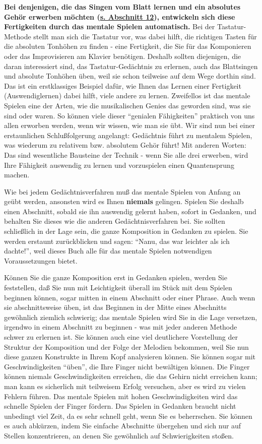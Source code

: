\textbf{Bei denjenigen, die das Singen vom Blatt lernen und ein absolutes Gehör erwerben möchten (\hyperref[c1iii12]{s. Abschnitt 12}), entwickeln sich diese Fertigkeiten durch das mentale Spielen automatisch.}
Bei der Tastatur-Methode stellt man sich die Tastatur vor, was dabei hilft, die richtigen Tasten für die absoluten Tonhöhen zu finden - eine Fertigkeit, die Sie für das Komponieren oder das Improvisieren am Klavier benötigen.
Deshalb sollten diejenigen, die daran interessiert sind, das Tastatur-Gedächtnis zu erlernen, auch das Blattsingen und absolute Tonhöhen üben, weil sie schon teilweise auf dem Wege dorthin sind.
Das ist ein erstklassiges Beispiel dafür, wie Ihnen das Lernen einer Fertigkeit (Auswendiglernen) dabei hilft, viele andere zu lernen.
Zweifellos ist das mentale Spielen eine der Arten, wie die musikalischen Genies das geworden sind, was sie sind oder waren.
So können viele dieser \enquote{genialen Fähigkeiten} praktisch von uns allen erworben werden, wenn wir wissen, wie man sie übt.
Wir sind nun bei einer erstaunlichen Schlußfolgerung angelangt: Gedächtnis führt zu mentalem Spielen, was wiederum zu relativem bzw. absolutem Gehör führt!
Mit anderen Worten: Das sind wesentliche Bausteine der Technik - wenn Sie alle drei erwerben, wird Ihre Fähigkeit auswendig zu lernen und vorzuspielen einen Quantensprung machen.

Wie bei jedem Gedächtnisverfahren muß das mentale Spielen von Anfang an geübt werden, ansonsten wird es Ihnen \textbf{niemals} gelingen.
Spielen Sie deshalb einen Abschnitt, sobald sie ihn auswendig gelernt haben, sofort in Gedanken, und behalten Sie dieses wie die anderen Gedächtnisverfahren bei.
Sie sollten schließlich in der Lage sein, die ganze Komposition in Gedanken zu spielen.
Sie werden erstaunt zurückblicken und sagen: \enquote{Nanu, das war leichter als ich dachte!}, weil dieses Buch alle für das mentale Spielen notwendigen Voraussetzungen bietet.

Können Sie die ganze Komposition erst in Gedanken spielen, werden Sie feststellen, daß Sie nun mit Leichtigkeit überall im Stück mit dem Spielen beginnen können, sogar mitten in einem Abschnitt oder einer Phrase.
Auch wenn sie abschnittsweise üben, ist das Beginnen in der Mitte eines Abschnitts gewöhnlich ziemlich schwierig; das mentale Spielen wird Sie in die Lage versetzen, irgendwo in einem Abschnitt zu beginnen - was mit jeder anderen Methode schwer zu erlernen ist.
Sie können auch eine viel deutlichere Vorstellung der Struktur der Komposition und der Folge der Melodien bekommen, weil Sie nun diese ganzen Konstrukte in Ihrem Kopf analysieren können.
Sie können sogar mit Geschwindigkeiten \enquote{üben}, die Ihre Finger nicht bewältigen können.
Die Finger können niemals Geschwindigkeiten erreichen, die das Gehirn nicht erreichen kann; man kann es sicherlich mit teilweisem Erfolg versuchen, aber es wird zu vielen Fehlern führen.
Das mentale Spielen mit hohen Geschwindigkeiten wird das schnelle Spielen der Finger fördern.
Das Spielen in Gedanken braucht nicht unbedingt viel Zeit, da es sehr schnell geht, wenn Sie es beherrschen.
Sie können es auch abkürzen, indem Sie einfache Abschnitte übergehen und sich nur auf Stellen konzentrieren, an denen Sie gewöhnlich auf Schwierigkeiten stoßen.

